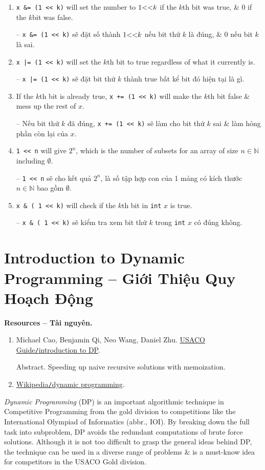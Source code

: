 \documentclass{article}
\begin{document}
\begin{enumerate}
    \item \verb|x &= (1 << k)| will set the number to $1{\tt<<}k$ if the $k$th bit was true, \& 0 if the $k$bit was false.

    -- \verb|x &= (1 << k)| sẽ đặt số thành $1{\tt<<}k$ nếu bit thứ $k$ là đúng, \& 0 nếu bit $k$ là sai.

    \item \verb!x |= (1 << k)! will set the $k$th bit to true regardless of what it currently is.

    -- \verb!x |= (1 << k)! sẽ đặt bit thứ $k$ thành true bất kể bit đó hiện tại là gì.

    \item If the $k$th bit is already true, \verb|x += (1 << k)| will make the $k$th bit false \& mess up the rest of $x$.

    -- Nếu bit thứ $k$ đã đúng, \verb|x += (1 << k)| sẽ làm cho bit thứ $k$ sai \& làm hỏng phần còn lại của $x$.

    \item \verb|1 << n| will give $2^n$, which is the number of subsets for an array of size $n\in\mathbb{N}$ including $\emptyset$.

    -- \verb|1 << n| sẽ cho kết quả $2^n$, là số tập hợp con của 1 mảng có kích thước $n\in\mathbb{N}$ bao gồm $\emptyset$.

    \item \verb|x & ( 1 << k)| will check if the $k$th bit in {\tt int} $x$ is true.

    -- \verb|x & ( 1 << k)| sẽ kiểm tra xem bit thứ $k$ trong {\tt int} $x$ có đúng không.
\end{enumerate}


\section{Introduction to Dynamic Programming -- Giới Thiệu Quy Hoạch Động}
\textbf{\textsf{Resources -- Tài nguyên.}}
\begin{enumerate}
    \item {\sc Michael Cao, Benjamin Qi, Neo Wang, Daniel Zhu}. \href{https://usaco.guide/gold/intro-dp}{USACO Guide{\tt/}introduction to DP}.

    {\sf Abstract.} Speeding up naive recursive solutions with memoization.

    \item \href{https://en.wikipedia.org/wiki/Dynamic_programming}{Wikipedia{\tt/}dynamic programming}.
\end{enumerate}
{\it Dynamic Programming} (DP) is an important algorithmic technique in Competitive Programming from the gold division to competitions like the International Olympiad of Informatics (abbr., IOI). By breaking down the full task into subproblem, DP avoids the redundant computations of brute force solutions. Although it is not too difficult to grasp the general ideas behind DP, the technique can be used in a diverse range of problems \& is a must-know idea for competitors in the USACO Gold division.
\end{document}
